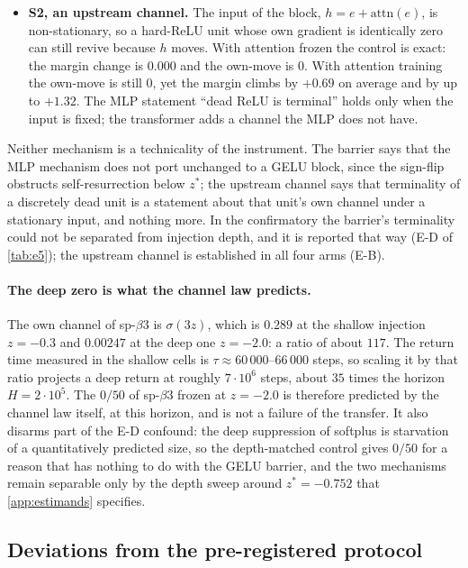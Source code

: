 \documentclass[11pt]{article}
\theoremstyle{definition}
\theoremstyle{remark}
\begin{document}
\begin{itemize}
\item \textbf{S2, an upstream channel.} The input of the block,
$h=e+\mathrm{attn}(e)$, is non-stationary, so a hard-ReLU unit whose own gradient
is identically zero can still revive because $h$ moves. With attention frozen the
control is exact: the margin change is $0.000$ and the own-move is $0$. With
attention training the own-move is still $0$, yet the margin climbs by $+0.69$ on
average and by up to $+1.32$. The MLP statement ``dead ReLU is terminal'' holds
only when the input is fixed; the transformer adds a channel the MLP does not
have.
\end{itemize}

Neither mechanism is a technicality of the instrument. The barrier says that the
MLP mechanism does not port unchanged to a GELU block, since the sign-flip
obstructs self-resurrection below $z^\ast$; the upstream channel says that
terminality of a discretely dead unit is a statement about that unit's own
channel under a stationary input, and nothing more. In the confirmatory the
barrier's terminality could not be separated from injection depth, and it is
reported that way (E-D of \cref{tab:e5}); the upstream channel is established in
all four arms (E-B).

\paragraph{The deep zero is what the channel law predicts.} The own channel of
sp-$\beta3$ is $\sigma(3z)$, which is $0.289$ at the shallow injection
$z=-0.3$ and $0.00247$ at the deep one $z=-2.0$: a ratio of about $117$. The
return time measured in the shallow cells is $\tau\approx60\,000$--$66\,000$
steps, so scaling it by that ratio projects a deep return at roughly
$7\cdot10^{6}$ steps, about $35$ times the horizon $H=2\cdot10^{5}$. The
$0/50$ of sp-$\beta3$ frozen at $z=-2.0$ is therefore predicted by the channel
law itself, at this horizon, and is not a failure of the transfer. It also
disarms part of the E-D confound: the deep suppression of softplus is
starvation of a quantitatively predicted size, so the depth-matched control
gives $0/50$ for a reason that has nothing to do with the GELU barrier, and
the two mechanisms remain separable only by the depth sweep around
$z^\ast=-0.752$ that \cref{app:estimands} specifies.

\subsection{Deviations from the pre-registered protocol}\label{sec:deviations}
\end{document}
